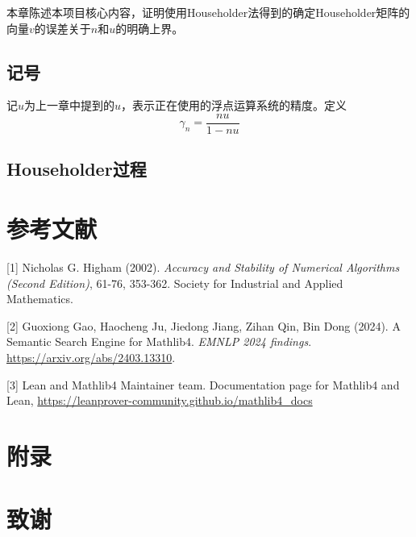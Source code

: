 \documentclass[UTF8,a4paper,openany]{ctexbook}
\begin{document}
本章陈述本项目核心内容，证明使用Householder法得到的确定Householder矩阵的向量$v$的误差关于$n$和$u$的明确上界。

\section{记号}

记$u$为上一章中提到的$u$，表示正在使用的浮点运算系统的精度。定义$$\gamma_n=\frac{nu}{1-nu}$$


\section{Householder过程}

\chapter*{参考文献}

[1] Nicholas G. Higham (2002). \textit{Accuracy and Stability of Numerical Algorithms (Second Edition)}, 61-76, 353-362. Society for Industrial and Applied Mathematics.

[2] Guoxiong Gao, Haocheng Ju, Jiedong Jiang, Zihan Qin, Bin Dong (2024). A Semantic Search Engine for Mathlib4. \textit{EMNLP 2024 findings}. \url{https://arxiv.org/abs/2403.13310}.

[3] Lean and Mathlib4 Maintainer team. Documentation page for Mathlib4 and Lean, \url{https://leanprover-community.github.io/mathlib4_docs}


\chapter*{附录}

\chapter*{致谢}


\end{document}
